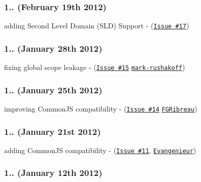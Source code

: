 \subsubsection*{1.. (February 19th 2012)}


\begin{DoxyItemize}
\item adding Second Level Domain (S\+LD) Support -\/ (\href{https://github.com/medialize/URI.js/issues/17}{\tt Issue \#17})
\end{DoxyItemize}

\subsubsection*{1.. (January 28th 2012)}


\begin{DoxyItemize}
\item fixing global scope leakage -\/ (\href{https://github.com/medialize/URI.js/issues/15}{\tt Issue \#15} \href{https://github.com/mark-rushakoff}{\tt mark-\/rushakoff})
\end{DoxyItemize}

\subsubsection*{1.. (January 25th 2012)}


\begin{DoxyItemize}
\item improving Common\+JS compatibility -\/ (\href{https://github.com/medialize/URI.js/issues/14}{\tt Issue \#14} \href{https://github.com/FGRibreau}{\tt F\+G\+Ribreau})
\end{DoxyItemize}

\subsubsection*{1.. (January 21st 2012)}


\begin{DoxyItemize}
\item adding Common\+JS compatibility -\/ (\href{https://github.com/medialize/URI.js/issues/11}{\tt Issue \#11}, \href{https://github.com/Evangenieur}{\tt Evangenieur})
\end{DoxyItemize}

\subsubsection*{1.. (January 12th 2012)}


